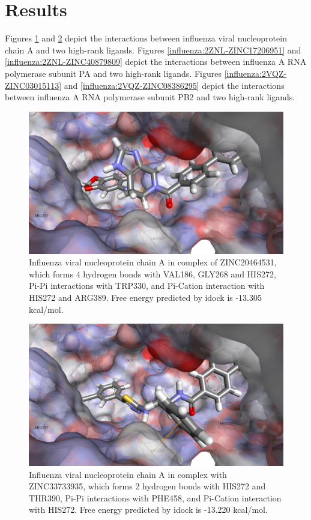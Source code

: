\section{Results}

Figures \ref{influenza:2IQH-ZINC20464531} and \ref{influenza:2IQH-ZINC33733935} depict the interactions between influenza viral nucleoprotein chain A and two high-rank ligands. Figures \ref{influenza:2ZNL-ZINC17206951} and \ref{influenza:2ZNL-ZINC40879809} depict the interactions between influenza A RNA polymerase subunit PA and two high-rank ligands. Figures \ref{influenza:2VQZ-ZINC03015113} and \ref{influenza:2VQZ-ZINC08386295} depict the interactions between influenza A RNA polymerase subunit PB2 and two high-rank ligands.

\begin{figure}
\centering
\includegraphics[width=\linewidth]{../influenza/2IQH-ZINC20464531.png}
\caption{Influenza viral nucleoprotein chain A in complex of ZINC20464531, which forms 4 hydrogen bonds with VAL186, GLY268 and HIS272, Pi-Pi interactions with TRP330, and Pi-Cation interaction with HIS272 and ARG389. Free energy predicted by idock is -13.305 kcal/mol.}
\label{influenza:2IQH-ZINC20464531}
\end{figure}

\begin{figure}
\centering
\includegraphics[width=\linewidth]{../influenza/2IQH-ZINC33733935.png}
\caption{Influenza viral nucleoprotein chain A in complex with ZINC33733935, which forms 2 hydrogen bonds with HIS272 and THR390, Pi-Pi interactions with PHE458, and Pi-Cation interaction with HIS272. Free energy predicted by idock is -13.220 kcal/mol.}
\label{influenza:2IQH-ZINC33733935}
\end{figure}


